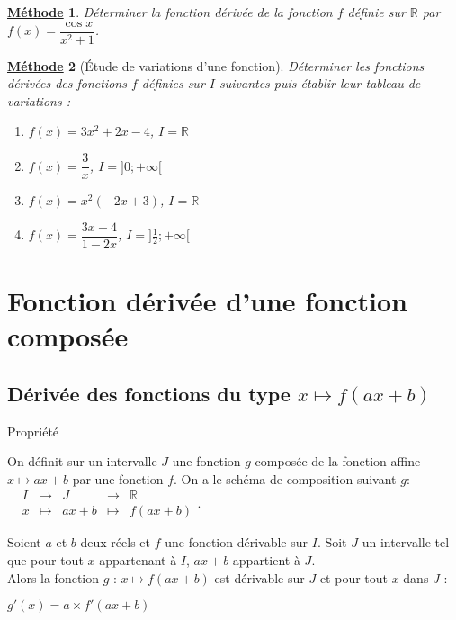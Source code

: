 \documentclass[11pt,a4paper]{article}
\def\R{{\mathbb R}}
\theoremstyle{break}
\newtheorem{Meth}{\underline{Méthode}}
\begin{document}

\begin{Meth}
	Déterminer la fonction dérivée de la fonction $f$ définie sur $\R$ par $f(x)=\dfrac{\cos x}{x^2+1}$.
\end{Meth}



\begin{Meth}[Étude de variations d'une fonction]
	Déterminer les fonctions dérivées des fonctions $f$ définies sur $I$ suivantes puis établir leur tableau de variations :
	\begin{multicols}{2}
		\begin{enumerate}
			\item $f(x)=3x^2+2x-4$, $I=\R$ \\ 
			\item $f(x)=\dfrac3x$, $I=]0;+\infty[$ \\ 
			\item $f(x)=x^2(-2x+3)$, $I=\R$ \\ 
			\item $f(x)=\dfrac{3x+4}{1-2x}$, $I=]\frac12;+\infty[$ \\
			
		\end{enumerate}
	\end{multicols}
\end{Meth}


\newpage
\section{Fonction dérivée d'une fonction composée} 

\subsection{Dérivée des fonctions du type $x \mapsto f(ax+b)$}
	\begin{bclogo}[couleur = yellow!30, arrondi = 0.1,logo=\bcbook]{Propriété}

On définit sur un intervalle $J$ une fonction $g$ composée de la fonction affine $x \mapsto ax+b$ par une fonction $f$. On a le schéma de composition suivant $g$: $\begin{array}{l|rclcl}
& I & \longrightarrow & J  & \longrightarrow & \R\\
& x & \longmapsto & ax+b &  \longmapsto & f(ax+b) \end{array}$. 

	Soient $a$ et $b$ deux réels et $f$ une fonction dérivable sur $I$. Soit $J$ un intervalle tel que pour tout $x$ appartenant à $I$, $ax+b$ appartient à $J$. \\
	Alors la fonction $g$ : $x \mapsto f(ax+b) $ est dérivable sur $J$ et pour tout $x$ dans $J$ :  
	\begin{center}
	$g'(x)=a \times f'(ax+b)$
	\end{center}
\end{bclogo}
\end{document}
